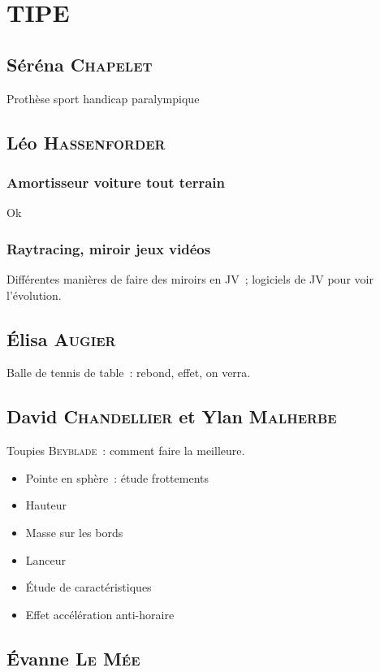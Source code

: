 \documentclass[a4paper, 11pt, final, garamond]{book}
\begin{document}
\setcounter{chapter}{0}

\chapter{TIPE}

\section{Séréna \textsc{Chapelet}}
Prothèse sport handicap paralympique

\section{Léo \textsc{Hassenforder}}
\subsection{Amortisseur voiture tout terrain}
Ok

\subsection{Raytracing, miroir jeux vidéos}
Différentes manières de faire des miroirs en JV~; logiciels de JV pour voir
l'évolution.

\section{Élisa \textsc{Augier}}
Balle de tennis de table~: rebond, effet, on verra.

\section{David \textsc{Chandellier} et Ylan \textsc{Malherbe}}
Toupies \textsc{Beyblade}~: comment faire la meilleure.

\begin{itemize}
    \item Pointe en sphère~: étude frottements
    \item Hauteur
    \item Masse sur les bords
    \item Lanceur
    \item Étude de caractéristiques
    \item Effet accélération anti-horaire
\end{itemize}

\section{Évanne \textsc{Le Mée}}
\end{document}

